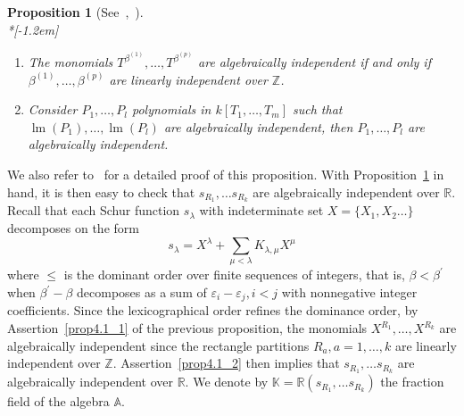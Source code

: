 \documentclass[10pt,a4paper]{amsart}
\newtheorem{prop}[theorem]{Proposition}
\theoremstyle{definition}
\DeclareMathOperator{\lm}{lm}
\begin{document}
\begin{prop}
[{See~\cite[Lemma~4.2.10]{Mitt},~\cite[Proposition~6.6.11]{KR}}]\label{Prop_alge_inde}\ \\*[-1.2em]

\begin{enumerate}
\item\label{prop4.1_1} The monomials $T^{\beta^{(1)}},\ldots,T^{\beta^{(p)}}$ are algebraically
independent if and only if $\beta^{(1)},\ldots,\beta^{(p)}$ are linearly
independent over $\mathbb{Z}$.

\item\label{prop4.1_2} Consider $P_{1},\ldots,P_{l}$ polynomials in $k[T_{1},\ldots,T_{m}]$
such that $\lm (P_{1}),\ldots,\lm (P_{l})$ are algebraically
independent, then $P_{1},\ldots,P_{l}$ are algebraically independent.
\end{enumerate}
\end{prop}
We also refer to~\cite[Section~3]{Pan} for a detailed proof of this proposition. With Proposition~\ref{Prop_alge_inde} in hand, it is then easy to check that
$s_{R_{1}},\ldots s_{R_{k}}$ are algebraically independent over $\mathbb{R}$.
Recall that each Schur function $s_{\lambda}$ with indeterminate set
$X=\{X_{1},X_{2}\ldots\}$ decomposes on the form%
\[
s_{\lambda}=X^{\lambda}+\sum_{\mu<\lambda}K_{\lambda,\mu}X^{\mu}%
\]
where $\leq$ is the dominant order over finite sequences of integers, that is,
$\beta<\beta^{\prime}$ when $\beta^{\prime}-\beta$ decomposes as a sum of
$\varepsilon_{i}-\varepsilon_{j},i<j$ with nonnegative integer coefficients.
Since the lexicographical order refines the dominance order,
by Assertion~\eqref{prop4.1_1} of the previous proposition, the monomials $X^{R_{1}}%
,\ldots,X^{R_{k}}$ are algebraically independent since the rectangle
partitions $R_{a},a=1,\ldots,k$ are linearly independent over $\mathbb{Z}$.
Assertion~\eqref{prop4.1_2} then implies that $s_{R_{1}},\ldots s_{R_{k}}$ are algebraically
independent over $\mathbb{R}$. We denote by $\mathbb{K}=\mathbb{R}(s_{R_{1}%
},\ldots s_{R_{k}})$ the fraction field of the algebra $\mathbb{A}$.
\end{document}
